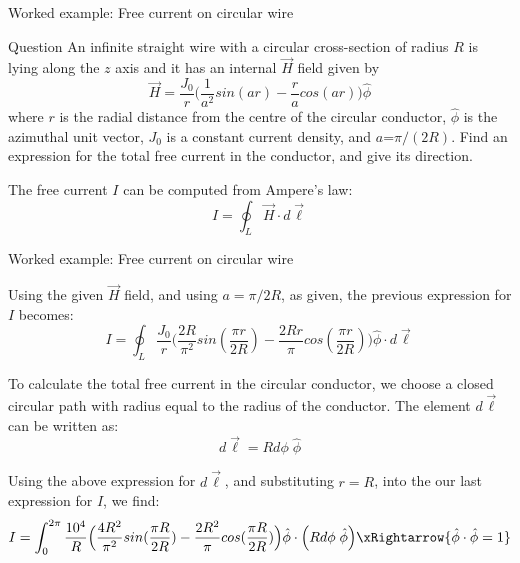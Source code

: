{
\problemslide

%
%
%

\begin{frame}{Worked example: Free current on circular wire}

  \begin{blockexmplque}{Question}
    An infinite straight wire with a circular cross-section
    of radius $R$ is lying along the $z$ axis
    and it has an internal $\vec{H}$ field given by
    \begin{equation*}
      \vec{H} = \frac{J_0}{r} \Big(\frac{1}{a^2} sin(ar) - \frac{r}{a} cos(ar) \Big) \hat{\phi}
    \end{equation*}
    where
    $r$ is the radial distance from the centre of the circular conductor,
    $\hat{\phi}$ is the azimuthal unit vector,
    $J_0$ is a constant current density,
    and $a$=$\pi/(2R)$.
    Find an expression for the total free current in the conductor,
    and give its direction.
  \end{blockexmplque}

  The free current $I$ can be computed from Ampere's law:
  \begin{equation*}
    I = \oint_{L} \vec{H} \cdot d\vec{\ell}
  \end{equation*}

\end{frame}

%
%
%

\begin{frame}{Worked example: Free current on circular wire}

  Using the given $\vec{H}$ field, and using $a=\pi/2R$, as given,
  the previous expression for $I$ becomes:
  \begin{equation*}
    I = \oint_{L} \frac{J_0}{r}
     \Big(\frac{2R}{\pi^2} sin(\frac{\pi r}{2R}) - \frac{2Rr}{\pi} cos(\frac{\pi r}{2R}) \Big) \hat{\phi}
     \cdot d\vec{\ell}
  \end{equation*}

  To calculate the total free current in the circular conductor, we choose
  a closed circular path with radius equal to the radius of the conductor.
  The element $d\vec{\ell}$ can be written as:
  \begin{equation*}
     d\vec{\ell} = R d\phi \; \hat{\phi}
  \end{equation*}

  Using the above expression for $d\vec{\ell}$, and substituting $r = R$,
  into the our last expression for $I$, we find:
  \begin{equation*}
    I = \int_{0}^{2\pi} \frac{10^4}{R}
     \Big(\frac{4R^2}{\pi^2} sin(\frac{\pi R}{2R}) - \frac{2R^2}{\pi} cos(\frac{\pi R}{2R}) \Big) \hat{\phi}
      \cdot \Big( R d\phi \; \hat{\phi} \Big) \xRightarrow{\hat{\phi} \cdot \hat{\phi} = 1}
  \end{equation*}


\end{frame}}
